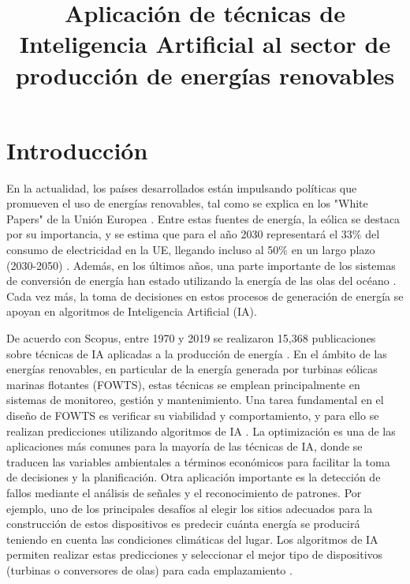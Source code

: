 \documentclass[12pt]{article}
\title{Aplicación de técnicas de Inteligencia Artificial 
al sector de producción de energías renovables}
\begin{document}
 
	
	\maketitle
	
	\section{Introducción}
	\label{sec:motivacion}
	
En la actualidad, los países desarrollados están impulsando políticas que promueven el uso de energías renovables, tal como se explica en los "White Papers" de la Unión Europea \citep{Garcia}. Entre estas fuentes de energía, la eólica se destaca por su importancia, y se estima que para el año 2030 representará el 33$\%$  del consumo de electricidad en la UE, llegando incluso al 50$\%$  en un largo plazo (2030-2050) \citep{Amanatidis,Mitchell}. Además, en los últimos años, una parte importante de los sistemas de conversión de energía han estado utilizando la energía de las olas del océano \citep{Mahsa}. Cada vez más, la toma de decisiones en estos procesos de generación de energía se apoyan en algoritmos de Inteligencia Artificial (IA).

De acuerdo con Scopus, entre 1970 y 2019 se realizaron 15,368 publicaciones sobre técnicas de IA aplicadas a la producción de energía \citep{Garcia}. En el ámbito de las energías renovables, en particular de la energía generada por turbinas eólicas marinas flotantes (FOWTS), estas técnicas se emplean principalmente en sistemas de monitoreo, gestión y mantenimiento. Una tarea fundamental en el diseño de FOWTS es verificar su viabilidad y comportamiento, y para ello se realizan predicciones utilizando algoritmos de IA \citep{Chen}. La optimización es una de las aplicaciones más comunes para la mayoría de las técnicas de IA, donde se traducen las variables ambientales a términos económicos para facilitar la toma de decisiones y la planificación. Otra aplicación importante es la detección de fallos mediante el análisis de señales y el reconocimiento de patrones. Por ejemplo, uno de los principales desafíos al elegir los sitios adecuados para la construcción de estos dispositivos es predecir cuánta energía se producirá teniendo en cuenta las condiciones climáticas del lugar. Los algoritmos de IA permiten realizar estas predicciones y seleccionar el mejor tipo de dispositivos (turbinas o conversores de olas) para cada emplazamiento \citep{Mahsa}.
\end{document}
